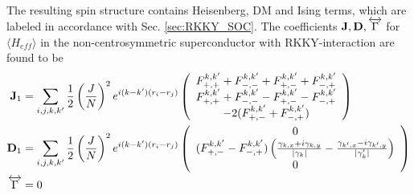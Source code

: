 The resulting spin structure contains Heisenberg, DM and Ising terms, which are labeled in accordance with Sec. \ref{sec:RKKY_SOC}.
The coefficients $\vb{J}, \vb{D}, \overleftrightarrow{\Gamma}$ for $\langle H_{eff} \rangle$ in the non-centrosymmetric superconductor with RKKY-interaction are found to be
\begin{align}\label{eq:eff_spin_1}
    \vb{J}_1 &= \sum_{i,j,k,k'} \frac{1}{2}\left(\frac{J}{N}\right)^2 e^{i(k-k')(r_i-r_j)}\left( 
    \begin{array}{c}
         F^{k,k'}_{+,+} +  F^{k,k'}_{-,-} +  F^{k,k'}_{+,-} +  F^{k,k'}_{-,+}\\
          F^{k,k'}_{+,+} +  F^{k,k'}_{-,-} -  F^{k,k'}_{+,-} -  F^{k,k'}_{-,+}\\
         -2 ( F^{k,k'}_{+,-} +  F^{k,k'}_{-,+})
    \end{array}
    \right) \\ \nonumber
    \vb{D}_1 &= \sum_{i,j,k,k'} \frac{1}{2}\left(\frac{J}{N}\right)^2 e^{i(k-k')(r_i-r_j)}\left( 
    \begin{array}{c}
        0\\
         ( F^{k,k'}_{+,-} -  F^{k,k'}_{-,+})\left(\frac{\gamma_{k,x} + i \gamma_{k,y}}{|\gamma_k|} - \frac{\gamma_{k',x} - i \gamma_{k',y}}{|\gamma_k'|}\right)\\
         0
    \end{array}
    \right) \\ \nonumber
   \overleftrightarrow{\Gamma} &= 0
\end{align}
